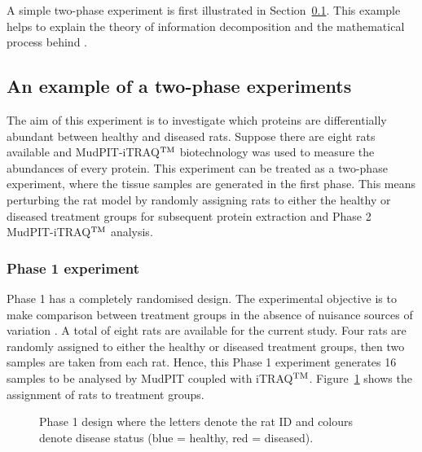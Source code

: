 \documentclass[article]{jss}
\begin{document}
A simple two-phase experiment is first illustrated in Section~\ref{subsec:exampleTwoPase}. This example helps to explain the theory of information decomposition and the mathematical process behind .

\subsection[Example of two-phase experiments]{An example of a two-phase experiments} \label{subsec:exampleTwoPase}
The aim of this experiment is to investigate which proteins are differentially abundant between healthy and diseased rats. Suppose there are eight rats available and MudPIT-iTRAQ$^{\rm TM}$ biotechnology was used to measure the abundances of every protein. This experiment can be treated as a two-phase experiment, where the tissue samples are generated in the first phase. This means perturbing the rat model by randomly assigning rats to either the healthy or diseased treatment groups for subsequent protein extraction and Phase 2 MudPIT-iTRAQ$^{\rm TM}$ analysis.

\subsubsection{Phase 1 experiment}
Phase 1 has a completely randomised design. The experimental objective is to make comparison between treatment groups in the absence of nuisance sources of variation \citep{Mead1988}. A total of eight rats are available for the current study. Four rats are randomly assigned to either the healthy or diseased treatment groups, then two samples are taken from each rat. Hence, this Phase 1 experiment generates 16 samples to be analysed by MudPIT coupled with iTRAQ$^{\rm TM}$. Figure~\ref{fig:phase1Design} shows the assignment of rats to treatment groups.

\begin{figure}[hbt]
\caption{Phase 1 design where the letters denote the rat ID and colours denote disease status (blue = healthy, red = diseased).}
\label{fig:phase1Design}
\end{figure}
\end{document}
